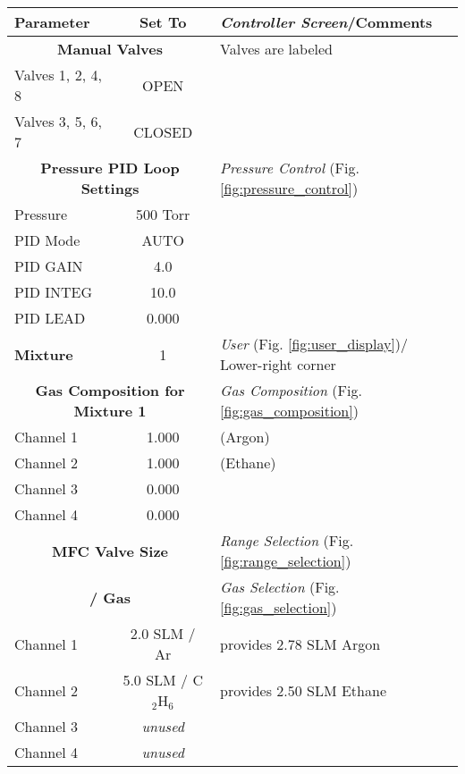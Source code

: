 {\begin{table}[hbt]
\begin{minipage}[h!]{\textwidth}
{\scriptsize
\begin{center}
\begin{tabular}{|l|c|l|}
\hline
Parameter   & Set To   & {\it Controller Screen}/Comments\\ \hline
\multicolumn{2}{|c|}{\bf Manual Valves  } &  Valves are labeled        \\
Valves 1, 2, 4, 8 & OPEN                  &         \\
Valves 3, 5, 6, 7 & CLOSED                &         \\ \hline
\multicolumn{2}{|c|}{\bf Pressure PID Loop Settings   } & {\it Pressure Control} (Fig. \ref{fig:pressure_control})  \\
Pressure    & 500 Torr &                   \\
PID Mode    & AUTO     &                   \\
PID GAIN    & 4.0      &                   \\
PID INTEG   & 10.0     &                   \\
PID LEAD    & 0.000    &                   \\ \hline
\bf Mixture     & 1        & {\it User} (Fig. \ref{fig:user_display})/ Lower-right corner\\ \hline
\multicolumn{2}{|c|}{\bf Gas Composition for Mixture 1} & {\it Gas Composition} (Fig. \ref{fig:gas_composition})\\
Channel 1   & 1.000    &  (Argon)                 \\
Channel 2   & 1.000    &  (Ethane)                 \\
Channel 3   & 0.000    &                   \\
Channel 4   & 0.000    &                   \\ \hline
\multicolumn{2}{|c|}{\bf MFC Valve Size } & {\it Range Selection} (Fig. \ref{fig:range_selection})  \\
\multicolumn{2}{|c|}{\bf  / Gas}             & {\it Gas Selection} (Fig. \ref{fig:gas_selection})  \\
Channel 1   & 2.0 SLM / Ar         & provides 2.78 SLM Argon\\
Channel 2   & 5.0 SLM / C$_2$H$_6$ & provides 2.50 SLM Ethane\\
Channel 3   & \it unused&                  \\
Channel 4   & \it unused&                  \\ \hline

\end{tabular}
\end{center}}
\end{minipage}
\end{table}}
